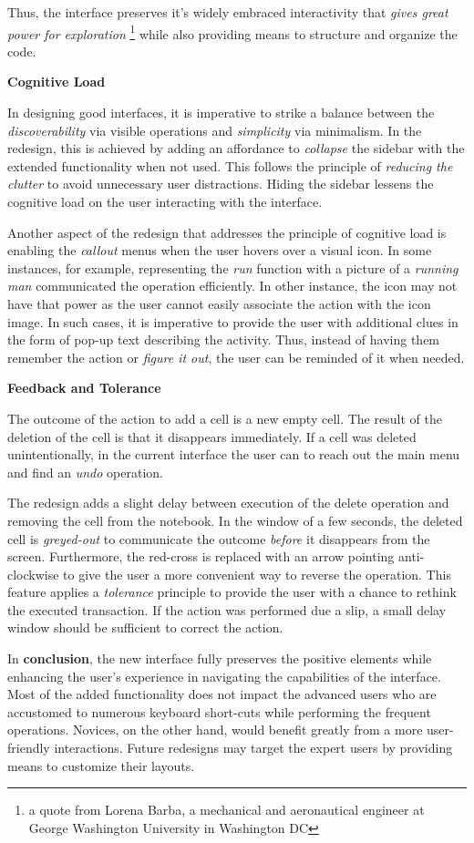 \documentclass[12pt,letterpaper]{article}
\begin{document}
Thus, the interface preserves it's widely embraced interactivity that \textit{gives great power for exploration} \footnote{a quote from Lorena Barba, a  mechanical and aeronautical engineer at George Washington University in Washington DC} while also providing means to structure and organize the code.


\textbf{Cognitive Load}

In designing good interfaces, it is imperative to strike a balance between the \textit{discoverability} via visible operations and \textit{simplicity} via minimalism. In the redesign, this is achieved by adding an affordance to \textit{collapse} the sidebar with the extended functionality when not used. This follows the principle of \textit{reducing the clutter} to avoid unnecessary user distractions. Hiding the sidebar lessens the cognitive load on the user interacting with the interface. 

Another aspect of the redesign that addresses the principle of cognitive load is enabling the \textit{callout} menus when the user hovers over a visual icon. In some instances, for example, representing the \textit{run} function with a picture of a \textit{running man} communicated the operation efficiently. In other instance, the icon may not have that power as the user cannot easily associate the action with the icon image. In such cases, it is imperative to provide the user with additional clues in the form of pop-up text describing the activity. Thus, instead of having them remember the action or \textit{figure it out}, the user can be reminded of it when needed.  

\textbf{Feedback and Tolerance}

The outcome of the action to add a cell is a new empty cell. The result of the deletion of the cell is that it disappears immediately. If a cell was deleted unintentionally, in the current interface the user can to reach out the main menu and find an \textit{undo} operation. 

The redesign adds a slight delay between execution of the delete operation and removing the cell from the notebook. In the window of a few seconds, the deleted cell is \textit{greyed-out} to communicate the outcome \textit{before} it disappears from the screen. Furthermore, the red-cross is replaced with an arrow pointing anti-clockwise to give the user a more convenient way to reverse the operation. This feature applies a \textit{tolerance} principle to provide the user with a chance to rethink the executed transaction. If the action was performed due a slip, a small delay window should be sufficient to correct the action.

\bigbreak
In \textbf{conclusion}, the new interface fully preserves the positive elements while enhancing the user's experience in navigating the capabilities of the interface. Most of the added functionality does not impact the advanced users who are accustomed to numerous keyboard short-cuts while performing the frequent operations. Novices, on the other hand, would benefit greatly from a more user-friendly interactions. Future redesigns may target the expert users by providing means to customize their layouts. 

 

\end{document}
